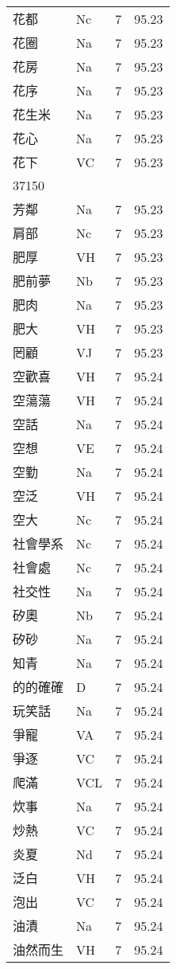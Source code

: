 \documentclass[twocolumn]{book}
\begin{document}
\begin{supertabular}{llrr}
花都 & Nc & 7 &  95.23\\
花圈 & Na & 7 &  95.23\\
花房 & Na & 7 &  95.23\\
花序 & Na & 7 &  95.23\\
花生米 & Na & 7 &  95.23\\
花心 & Na & 7 &  95.23\\
花下 & VC & 7 &  95.23\\
37150\\
芳鄰 & Na & 7 &  95.23\\
肩部 & Nc & 7 &  95.23\\
肥厚 & VH & 7 &  95.23\\
肥前夢 & Nb & 7 &  95.23\\
肥肉 & Na & 7 &  95.23\\
肥大 & VH & 7 &  95.23\\
罔顧 & VJ & 7 &  95.23\\
空歡喜 & VH & 7 &  95.24\\
空蕩蕩 & VH & 7 &  95.24\\
空話 & Na & 7 &  95.24\\
空想 & VE & 7 &  95.24\\
空勤 & Na & 7 &  95.24\\
空泛 & VH & 7 &  95.24\\
空大 & Nc & 7 &  95.24\\
社會學系 & Nc & 7 &  95.24\\
社會處 & Nc & 7 &  95.24\\
社交性 & Na & 7 &  95.24\\
矽奧 & Nb & 7 &  95.24\\
矽砂 & Na & 7 &  95.24\\
知青 & Na & 7 &  95.24\\
的的確確 & D & 7 &  95.24\\
玩笑話 & Na & 7 &  95.24\\
爭寵 & VA & 7 &  95.24\\
爭逐 & VC & 7 &  95.24\\
爬滿 & VCL & 7 &  95.24\\
炊事 & Na & 7 &  95.24\\
炒熱 & VC & 7 &  95.24\\
炎夏 & Nd & 7 &  95.24\\
泛白 & VH & 7 &  95.24\\
泡出 & VC & 7 &  95.24\\
油漬 & Na & 7 &  95.24\\
油然而生 & VH & 7 &  95.24\\

\end{supertabular}
\end{document}
